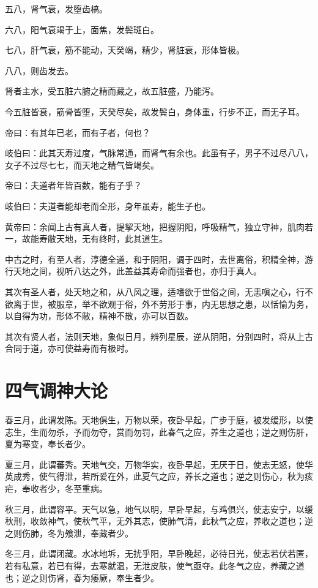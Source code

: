 \documentclass{article}%
\begin{document}
五八，肾气衰，发堕齿槁。

六八，阳气衰竭于上，面焦，发鬓斑白。

七八，肝气衰，筋不能动，天癸竭，精少，肾脏衰，形体皆极。

八八，则齿发去。

肾者主水，受五脏六腑之精而藏之，故五脏盛，乃能泻。

今五脏皆衰，筋骨皆堕，天癸尽矣，故发鬓白，身体重，行步不正，而无子耳。

帝曰：有其年已老，而有子者，何也？

岐伯曰：此其天寿过度，气脉常通，而肾气有余也。此虽有子，男子不过尽八八，女子不过尽七七，而天地之精气皆竭矣。

帝曰：夫道者年皆百数，能有子乎？

岐伯曰：夫道者能却老而全形，身年虽寿，能生子也。

黄帝曰：余闻上古有真人者，提挈天地，把握阴阳，呼吸精气，独立守神，肌肉若一，故能寿敝天地，无有终时，此其道生。

中古之时，有至人者，淳德全道，和于阴阳，调于四时，去世离俗，积精全神，游行天地之间，视听八达之外，此盖益其寿命而强者也，亦归于真人。

其次有圣人者，处天地之和，从八风之理，适嗜欲于世俗之间，无恚嗔之心，行不欲离于世，被服章，举不欲观于俗，外不劳形于事，内无思想之患，以恬愉为务，以自得为功，形体不敝，精神不散，亦可以百数。

其次有贤人者，法则天地，象似日月，辨列星辰，逆从阴阳，分别四时，将从上古合同于道，亦可使益寿而有极时。


\section{四气调神大论}
春三月，此谓发陈。天地俱生，万物以荣，夜卧早起，广步于庭，被发缓形，以使志生，生而勿杀，予而勿夺，赏而勿罚，此春气之应，养生之道也；逆之则伤肝，夏为寒变，奉长者少。

夏三月，此谓蕃秀。天地气交，万物华实，夜卧早起，无厌于日，使志无怒，使华英成秀，使气得泄，若所爱在外，此夏气之应，养长之道也；逆之则伤心，秋为痎疟，奉收者少，冬至重病。

秋三月，此谓容平。天气以急，地气以明，早卧早起，与鸡俱兴，使志安宁，以缓秋刑，收敛神气，使秋气平，无外其志，使肺气清，此秋气之应，养收之道也；逆之则伤肺，冬为飧泄，奉藏者少。

冬三月，此谓闭藏。水冰地坼，无扰乎阳，早卧晚起，必待日光，使志若伏若匿，若有私意，若已有得，去寒就温，无泄皮肤，使气亟夺。此冬气之应，养藏之道也；逆之则伤肾，春为痿厥，奉生者少。
\end{document}
